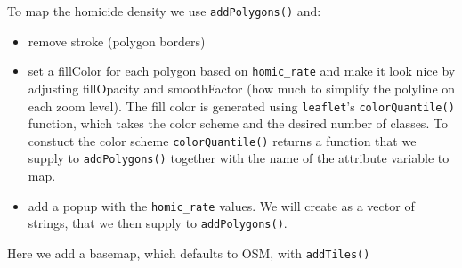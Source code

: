 \documentclass[
]{book}
\newenvironment{Shaded}{\begin{snugshade}}{\end{snugshade}}
\newcommand{\AttributeTok}[1]{\textcolor[rgb]{0.13,0.29,0.53}{#1}}
\newcommand{\CommentTok}[1]{\textcolor[rgb]{0.56,0.35,0.01}{\textit{#1}}}
\newcommand{\ConstantTok}[1]{\textcolor[rgb]{0.56,0.35,0.01}{#1}}
\newcommand{\DecValTok}[1]{\textcolor[rgb]{0.00,0.00,0.81}{#1}}
\newcommand{\FloatTok}[1]{\textcolor[rgb]{0.00,0.00,0.81}{#1}}
\newcommand{\FunctionTok}[1]{\textcolor[rgb]{0.13,0.29,0.53}{\textbf{#1}}}
\newcommand{\NormalTok}[1]{#1}
\newcommand{\OtherTok}[1]{\textcolor[rgb]{0.56,0.35,0.01}{#1}}
\newcommand{\SpecialCharTok}[1]{\textcolor[rgb]{0.81,0.36,0.00}{\textbf{#1}}}
\newcommand{\StringTok}[1]{\textcolor[rgb]{0.31,0.60,0.02}{#1}}
\providecommand{\tightlist}{%
  \setlength{\itemsep}{0pt}\setlength{\parskip}{0pt}}
\begin{document}
To map the homicide density we use \texttt{addPolygons()} and:

\begin{itemize}
\tightlist
\item
  remove stroke (polygon borders)\\
\item
  set a fillColor for each polygon based on \texttt{homic\_rate} and make it look nice by adjusting fillOpacity and smoothFactor (how much to simplify the polyline on each zoom level). The fill color is generated using \texttt{leaflet}'s \texttt{colorQuantile()} function, which takes the color scheme and the desired number of classes. To constuct the color scheme \texttt{colorQuantile()} returns a function that we supply to \texttt{addPolygons()} together with the name of the attribute variable to map.\\
\item
  add a popup with the \texttt{homic\_rate} values. We will create as a vector of strings, that we then supply to \texttt{addPolygons()}.
\end{itemize}

\begin{Shaded}
\end{Shaded}

Here we add a basemap, which defaults to OSM, with \texttt{addTiles()}
\end{document}
